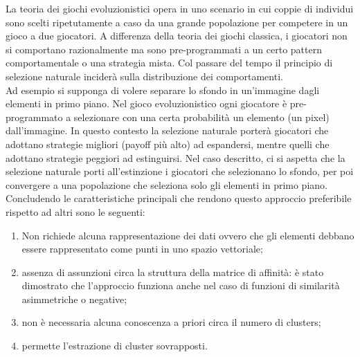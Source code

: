 La teoria dei giochi evoluzionistici opera in uno scenario in cui coppie di individui sono scelti ripetutamente a caso da una grande popolazione per competere in un gioco a due giocatori. A differenza della teoria dei giochi classica, i giocatori non si comportano razionalmente ma sono pre-programmati a un certo pattern comportamentale o una strategia mista. Col passare del tempo il principio di selezione naturale inciderà sulla distribuzione dei comportamenti.\\

Ad esempio si supponga di volere separare lo sfondo in un'immagine dagli elementi in primo piano. Nel gioco evoluzionistico ogni giocatore è pre-programmato a selezionare con una certa probabilità un elemento (un pixel) dall'immagine. In questo contesto la selezione naturale porterà giocatori che adottano strategie migliori (payoff più alto) ad espandersi, mentre quelli che adottano strategie peggiori ad estinguirsi. Nel caso descritto, ci si aspetta che la selezione naturale porti all'estinzione i giocatori che selezionano lo sfondo, per poi convergere a una popolazione che seleziona solo gli elementi in primo piano.\\

Concludendo le caratteristiche principali che rendono questo approccio preferibile rispetto ad altri sono le seguenti:
\begin{enumerate}
	\item Non richiede alcuna rappresentazione dei dati ovvero che gli elementi debbano essere rappresentato come punti in uno spazio vettoriale;
	\item assenza di assunzioni circa la struttura della matrice di affinità: è stato dimostrato che l'approccio funziona anche nel caso di funzioni di similarità asimmetriche o negative;
	\item non è necessaria alcuna conoscenza a priori circa il numero di clusters;
	\item permette l'estrazione di cluster sovrapposti.
\end{enumerate}





















